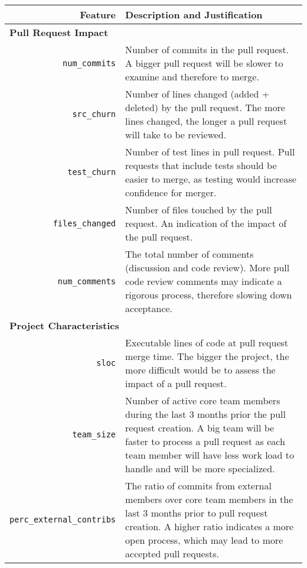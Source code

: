 \documentclass{sig-alternate}
\begin{document}
\begin{table*}
  \begin{small}
  \centering
  \begin{tabular}{rp{40em}}
    \hline
    \bf{Feature} & \bf{Description and Justification}\\
    \hline
    \multicolumn{2}{l}{\bf{Pull Request Impact}}\\
    
    \texttt{num\_commits} & Number of commits in the pull request. A bigger
    pull request will be slower to examine and therefore to merge.\\
    
    \texttt{src\_churn} & Number of lines changed (added + deleted) by the pull
    request. The more lines changed, the longer a pull request will take to be
    reviewed.\\

    \texttt{test\_churn} & Number of test lines in pull request. Pull requests
    that include tests should be easier to merge, as testing would increase
    confidence for merger.\\
    
    \texttt{files\_changed} & Number of files touched by the pull request. An
    indication of the impact of the pull request.\\
    
    \texttt{num\_comments} & The total number of comments (discussion and code
    review). More pull code review comments may indicate a rigorous process,
    therefore slowing down acceptance.\\

    \multicolumn{2}{l}{\bf{Project Characteristics}}\\
    
    \texttt{sloc} & Executable lines of code at pull request merge time. The
    bigger the project, the more difficult would be to assess the impact of
    a pull request. \\

    \texttt{team\_size} & Number of active core team members during the last
    3 months prior the pull request creation. A big team will be faster to process a
    pull request as each team member will have less work load to handle and
    will be more specialized.\\

    \texttt{perc\_external\_contribs} & The ratio of commits from external
    members over core team members in the last 3 months prior to pull request
    creation. A higher ratio indicates a more open
    process, which may lead to more accepted pull requests.\\


\end{tabular}
\end{small}
\end{table*}
\end{document}
